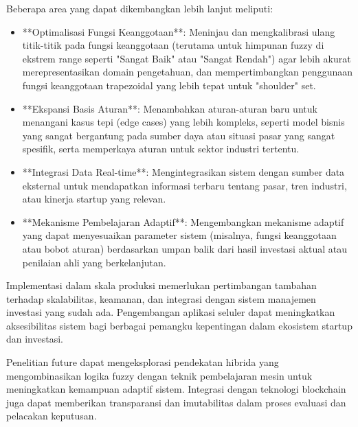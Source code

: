 \documentclass[12pt,a4paper]{article}
\begin{document}
Beberapa area yang dapat dikembangkan lebih lanjut meliputi:
\begin{itemize}
    \item **Optimalisasi Fungsi Keanggotaan**: Meninjau dan mengkalibrasi ulang titik-titik pada fungsi keanggotaan (terutama untuk himpunan fuzzy di ekstrem range seperti "Sangat Baik" atau "Sangat Rendah") agar lebih akurat merepresentasikan domain pengetahuan, dan mempertimbangkan penggunaan fungsi keanggotaan trapezoidal yang lebih tepat untuk "shoulder" set.
    \item **Ekspansi Basis Aturan**: Menambahkan aturan-aturan baru untuk menangani kasus tepi (edge cases) yang lebih kompleks, seperti model bisnis yang sangat bergantung pada sumber daya atau situasi pasar yang sangat spesifik, serta memperkaya aturan untuk sektor industri tertentu.
    \item **Integrasi Data Real-time**: Mengintegrasikan sistem dengan sumber data eksternal untuk mendapatkan informasi terbaru tentang pasar, tren industri, atau kinerja startup yang relevan.
    \item **Mekanisme Pembelajaran Adaptif**: Mengembangkan mekanisme adaptif yang dapat menyesuaikan parameter sistem (misalnya, fungsi keanggotaan atau bobot aturan) berdasarkan umpan balik dari hasil investasi aktual atau penilaian ahli yang berkelanjutan.
\end{itemize}
Implementasi dalam skala produksi memerlukan pertimbangan tambahan terhadap skalabilitas, keamanan, dan integrasi dengan sistem manajemen investasi yang sudah ada. Pengembangan aplikasi seluler dapat meningkatkan aksesibilitas sistem bagi berbagai pemangku kepentingan dalam ekosistem startup dan investasi.

Penelitian future dapat mengeksplorasi pendekatan hibrida yang mengombinasikan logika fuzzy dengan teknik pembelajaran mesin untuk meningkatkan kemampuan adaptif sistem. Integrasi dengan teknologi blockchain juga dapat memberikan transparansi dan imutabilitas dalam proses evaluasi dan pelacakan keputusan.
\end{document}
